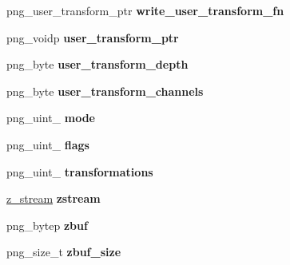 \begin{DoxyCompactItemize}
\item 
\hypertarget{structpng__struct__def_afec7d5da6863af6d349a67674fd8a940}{png\+\_\+user\+\_\+transform\+\_\+ptr {\bfseries write\+\_\+user\+\_\+transform\+\_\+fn}}\label{structpng__struct__def_afec7d5da6863af6d349a67674fd8a940}

\item 
\hypertarget{structpng__struct__def_aa867d0801e45c3bf636be098958ebcd8}{png\+\_\+voidp {\bfseries user\+\_\+transform\+\_\+ptr}}\label{structpng__struct__def_aa867d0801e45c3bf636be098958ebcd8}

\item 
\hypertarget{structpng__struct__def_ad4fe873c4d7be923efb5bde5db223274}{png\+\_\+byte {\bfseries user\+\_\+transform\+\_\+depth}}\label{structpng__struct__def_ad4fe873c4d7be923efb5bde5db223274}

\item 
\hypertarget{structpng__struct__def_ac9bc0f519d1f5c949e2e19dfc7457339}{png\+\_\+byte {\bfseries user\+\_\+transform\+\_\+channels}}\label{structpng__struct__def_ac9bc0f519d1f5c949e2e19dfc7457339}

\item 
\hypertarget{structpng__struct__def_a6db33193ca2fdb01fa6d8da9756bd448}{png\+\_\+uint\+\_ {\bfseries mode}}\label{structpng__struct__def_a6db33193ca2fdb01fa6d8da9756bd448}

\item 
\hypertarget{structpng__struct__def_aa7529cc3d13e759037c504fddd6e1ae8}{png\+\_\+uint\+\_ {\bfseries flags}}\label{structpng__struct__def_aa7529cc3d13e759037c504fddd6e1ae8}

\item 
\hypertarget{structpng__struct__def_a4ab3e33248dd4c32880609a1a10fa725}{png\+\_\+uint\+\_ {\bfseries transformations}}\label{structpng__struct__def_a4ab3e33248dd4c32880609a1a10fa725}

\item 
\hypertarget{structpng__struct__def_aed56a6997ce7d1a90f0a143eb0964cd5}{\hyperlink{structz__stream__s}{z\+\_\+stream} {\bfseries zstream}}\label{structpng__struct__def_aed56a6997ce7d1a90f0a143eb0964cd5}

\item 
\hypertarget{structpng__struct__def_a8cd7436515e6ee37b4b895b4470ab052}{png\+\_\+bytep {\bfseries zbuf}}\label{structpng__struct__def_a8cd7436515e6ee37b4b895b4470ab052}

\item 
\hypertarget{structpng__struct__def_a7a4643dd3086efd14aa9708452c3fe2e}{png\+\_\+size\+\_\+t {\bfseries zbuf\+\_\+size}}\label{structpng__struct__def_a7a4643dd3086efd14aa9708452c3fe2e}


\end{DoxyCompactItemize}
